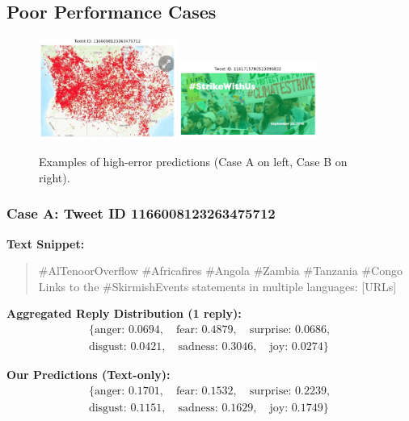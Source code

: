 \vspace{1em}
\subsection*{Poor Performance Cases}

\begin{figure}[h]
    \centering
    \includegraphics[width=0.4\textwidth]{images/bad1.png} 
    \hfill
    \includegraphics[width=0.4\textwidth]{images/bad2.png}
    \caption{Examples of high-error predictions (Case A on left, Case B on right).}
    \label{fig:bad_cases}
\end{figure}

\subsubsection*{Case A: Tweet ID 1166008123263475712}

\noindent\textbf{Text Snippet:}
\begin{quote}
\#AlTenoorOverflow \#Africafires \#Angola \#Zambia \#Tanzania \#Congo \\
Links to the \#SkirmishEvents statements in multiple languages: [URLs]
\end{quote}

\noindent\textbf{Aggregated Reply Distribution (1 reply):}
\[
\begin{aligned}
\{\text{anger: } 0.0694, \quad \text{fear: } 0.4879, \quad \text{surprise: } 0.0686, \\
\text{disgust: } 0.0421, \quad \text{sadness: } 0.3046, \quad \text{joy: } 0.0274\}
\end{aligned}
\]

\noindent\textbf{Our Predictions (Text-only):}
\[
\begin{aligned}
\{\text{anger: } 0.1701, \quad \text{fear: } 0.1532, \quad \text{surprise: } 0.2239, \\
\text{disgust: } 0.1151, \quad \text{sadness: } 0.1629, \quad \text{joy: } 0.1749\}
\end{aligned}
\]

